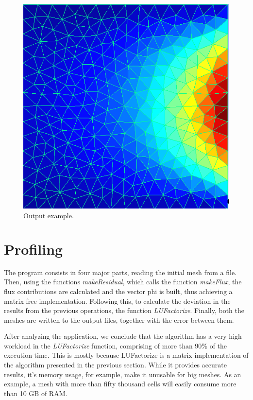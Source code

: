 \documentclass[a4paper,10pt,openright,openbib,twocolumn]{article}
\begin{document}
\begin{figure}[!htp]
    \centering
    \begin{minipage}[t]{\columnwidth}
        \includegraphics[width=\textwidth]{images/mesh_output.png}
        \caption{Output example.\label{fig:parallel}}
    \end{minipage}
\end{figure}


\section{Profiling}

The program consists in four major parts, reading the initial mesh from a file. Then, using the functions \emph{makeResidual}, which calls the function \emph{makeFlux}, the flux contributions are calculated and the vector phi is built, thus achieving a matrix free implementation. Following this, to calculate the deviation in the results from the previous operations, the function \emph{LUFactorize}. Finally, both the meshes are written to the output files, together with the error between them.
 
After analyzing the application, we conclude that the algorithm has a very high workload in the \emph{LUFactorize} function, comprising of more than 90\% of the execution time.
This is mostly because LUFactorize is a matrix implementation of the algorithm presented in the previous section. While it provides accurate results, it's memory usage, for example, make it unusable for big meshes. As an example, a mesh with more than fifty thousand cells will easily consume more than 10 GB of RAM.
\end{document}
